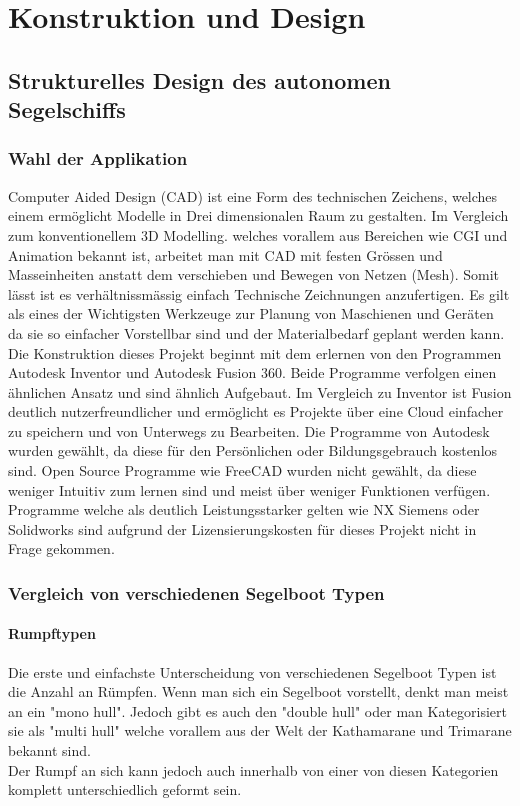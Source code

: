 

\chapter{Konstruktion und Design}
\label{chap:konstruktion}


\section{Strukturelles Design des autonomen Segelschiffs}
\subsection{Wahl der Applikation}
Computer Aided Design (CAD) ist eine Form des technischen Zeichens, welches einem ermöglicht Modelle in Drei dimensionalen Raum zu gestalten. Im Vergleich zum konventionellem 3D Modelling. welches vorallem aus Bereichen wie CGI und Animation bekannt ist, arbeitet man mit CAD mit festen Grössen und Masseinheiten anstatt dem verschieben und Bewegen von Netzen (Mesh). Somit lässt ist es verhältnissmässig einfach Technische Zeichnungen anzufertigen. Es gilt als eines der Wichtigsten Werkzeuge zur Planung von Maschienen und Geräten da sie so einfacher Vorstellbar sind und der Materialbedarf geplant werden kann. Die Konstruktion dieses Projekt beginnt mit dem erlernen von den Programmen Autodesk Inventor und Autodesk Fusion 360. 
Beide Programme verfolgen einen ähnlichen Ansatz und sind ähnlich Aufgebaut. Im Vergleich zu Inventor ist Fusion deutlich nutzerfreundlicher und ermöglicht es Projekte über eine Cloud einfacher zu speichern und von Unterwegs zu Bearbeiten. Die Programme von Autodesk wurden gewählt, da diese für den Persönlichen oder Bildungsgebrauch kostenlos sind. Open Source Programme wie FreeCAD wurden nicht gewählt, da diese weniger Intuitiv zum lernen sind und meist über weniger Funktionen verfügen. Programme welche als deutlich Leistungsstarker gelten wie NX Siemens oder Solidworks sind aufgrund der Lizensierungskosten für dieses Projekt nicht in Frage gekommen. 


\subsection{Vergleich von verschiedenen Segelboot Typen}

\subsubsection{Rumpftypen}
Die erste und einfachste Unterscheidung von verschiedenen Segelboot Typen ist die Anzahl an Rümpfen. Wenn man sich ein Segelboot vorstellt, denkt man meist an ein "mono hull". Jedoch gibt es auch den "double hull" oder man Kategorisiert sie als "multi hull" welche vorallem aus der Welt der Kathamarane und Trimarane bekannt sind.\\
Der Rumpf an sich kann jedoch auch innerhalb von einer von diesen Kategorien komplett unterschiedlich geformt sein. 
%

